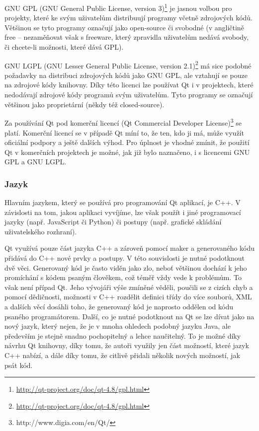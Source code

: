 \documentclass[a4paper,10pt]{article}
\begin{document}
GNU GPL (GNU General Public License, version 3)\footnote{\url{http://qt-project.org/doc/qt-4.8/gpl.html}} je jasnou volbou pro projekty, které ke svým uživatelům distribuují programy včetně zdrojových kódů.
Většinou se tyto programy označují jako open-source či svobodné (v angličtině free -- nezaměňovat však s freeware, který zpravidla uživatelům nedává svobody, či chcete-li možnosti, které dává GPL).

GNU LGPL (GNU Lesser General Public License, version 2.1)\footnote{\url{http://qt-project.org/doc/qt-4.8/gpl.html}} má sice podobné požadavky na distribuci zdrojových kódů jako GNU GPL, ale vztahují se pouze na zdrojové kódy knihovny.
Díky této licenci lze používat Qt i v projektech, které nedodávají zdrojové kódy programů svým uživatelům.
Tyto programy se označují většinou jako proprietární (někdy též closed-source).

Za používání Qt pod komerční licencí (Qt Commercial Developer License)\footnote{http://www.digia.com/en/Qt/} se platí.
Komerční licencí se v případě Qt míní to, že ten, kdo ji má, může využít oficiální podpory a ještě dalších výhod.
Pro úplnost je vhodné zmínit, že použití Qt v komerčních projektech je možné, jak již bylo naznačeno, i s licencemi GNU GPL a GNU LGPL.


\subsubsection{Jazyk}
Hlavním jazykem, který se používá pro programování Qt aplikací, je C++.
V závislosti na tom, jakou aplikaci vyvíjíme, lze však použít i jiné programovací jazyky (např. JavaScript či Python) či postupy (např. grafické skládání uživatelského rozhraní).

Qt využívá pouze část jazyka C++ a zároveň pomocí maker a generovaného kódu přidává do C++ nové prvky a postupy.
V této souvislosti je nutné podotknout dvě věci.
Generovaný kód je často viděn jako zlo, neboť většinou dochází k jeho promíchání s kódem psaným člověkem, což téměř vždy vede k problémům.
To však není případ Qt.
Jeho vývojáři výše zmíněné věděli, poučili se z cizích chyb a pomocí dědičnosti, možnosti v C++ rozdělit definici třídy do více souborů, XML a dalších věcí dosáhli toho, že generovaný kód je naprosto oddělen od kódu psaného programátorem.
Další, co je nutné podotknout na Qt se lze dívat jako na nový jazyk, který nejen, že je v mnoha ohledech podobný jazyku Java, ale především je stejně snadno pochopitelný a lehce naučitelný.
To je možné díky návrhu Qt knihovny, díky tomu, že autoři využily jen část možností, které jazyk C++ nabízí, a dále díky tomu, že citlivě přidali několik nových možností, jak psát kód.
\end{document}
